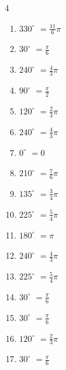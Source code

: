 \begin{multicols}{4}
\begin{enumerate}
  \item $\displaystyle 330^{\circ}$
        $\displaystyle =\frac{11}{6}\pi$

  \item $\displaystyle 30^{\circ}$
        $\displaystyle =\frac{\pi}{6}$

  \item $\displaystyle 240^{\circ}$
        $\displaystyle =\frac{4}{3}\pi$

  \item $\displaystyle 90^{\circ}$
        $\displaystyle =\frac{\pi}{2}$

  \item $\displaystyle 120^{\circ}$
        $\displaystyle =\frac{2}{3}\pi$

  \item $\displaystyle 240^{\circ}$
        $\displaystyle =\frac{4}{3}\pi$

  \item $\displaystyle 0^{\circ}$
        $\displaystyle =0$

  \item $\displaystyle 210^{\circ}$
        $\displaystyle =\frac{7}{6}\pi$

  \item $\displaystyle 135^{\circ}$
        $\displaystyle =\frac{3}{4}\pi$

  \item $\displaystyle 225^{\circ}$
        $\displaystyle =\frac{5}{4}\pi$

  \item $\displaystyle 180^{\circ}$
        $\displaystyle =\pi$

  \item $\displaystyle 240^{\circ}$
        $\displaystyle =\frac{4}{3}\pi$

\columnbreak %

  \item $\displaystyle 225^{\circ}$
        $\displaystyle =\frac{5}{4}\pi$

  \item $\displaystyle 30^{\circ}$
        $\displaystyle =\frac{\pi}{6}$

  \item $\displaystyle 30^{\circ}$
        $\displaystyle =\frac{\pi}{6}$

  \item $\displaystyle 120^{\circ}$
        $\displaystyle =\frac{2}{3}\pi$

  \item $\displaystyle 30^{\circ}$
        $\displaystyle =\frac{\pi}{6}$


\end{enumerate}
\end{multicols}
